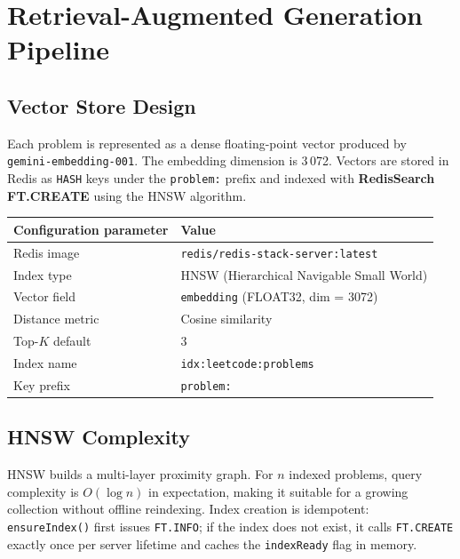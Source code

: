 \documentclass[11pt,a4paper]{article}
\begin{document}
\section{Retrieval-Augmented Generation Pipeline}

\subsection{Vector Store Design}

Each problem is represented as a dense floating-point vector produced by
\texttt{gemini-embedding-001}.  The embedding dimension is 3\,072.  Vectors are
stored in Redis as \texttt{HASH} keys under the \texttt{problem:} prefix and
indexed with \textbf{RedisSearch FT.CREATE} using the HNSW algorithm.

\begin{center}
\begin{tabular}{ll}
  \toprule
  \textbf{Configuration parameter} & \textbf{Value} \\
  \midrule
  Redis image     & \texttt{redis/redis-stack-server:latest} \\
  Index type      & HNSW (Hierarchical Navigable Small World) \\
  Vector field    & \texttt{embedding} (FLOAT32, dim = 3072) \\
  Distance metric & Cosine similarity \\
  Top-$K$ default & 3 \\
  Index name      & \texttt{idx:leetcode:problems} \\
  Key prefix      & \texttt{problem:} \\
  \bottomrule
\end{tabular}
\end{center}

\subsection{HNSW Complexity}

HNSW builds a multi-layer proximity graph.  For $n$ indexed problems, query
complexity is $O(\log n)$ in expectation, making it suitable for a growing
collection without offline reindexing.  Index creation is idempotent:
\texttt{ensureIndex()} first issues \texttt{FT.INFO}; if the index does not exist,
it calls \texttt{FT.CREATE} exactly once per server lifetime and caches the
\texttt{indexReady} flag in memory.
\end{document}
